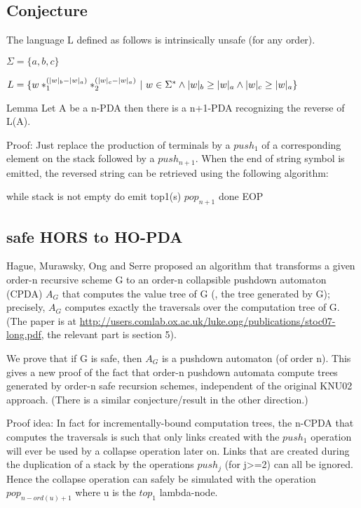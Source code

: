 \documentclass{article}
\begin{document}
\subsection{Conjecture}
The language L defined as follows is intrinsically unsafe (for any order).

$\Sigma = \{ a, b, c \}$

$L = \{ w *_1^{(|w|_b - |w|_a)} *_2^{(|w|_c - |w|_a)} \ | \
   w \in \Sigma^* \wedge |w|_b \geq |w|_a \wedge |w|_c \geq |w|_a \}$




Lemma Let A be a n-PDA then there is a n+1-PDA recognizing
the reverse of L(A).

Proof: Just replace the production of terminals by a $push_1$
of a corresponding element on the stack followed by a $push_{n+1}$.
When the end of string symbol is emitted, the reversed string can be
retrieved using the following algorithm:

    while stack is not empty do
       emit top1(s)
       $pop_{n+1}$
    done
EOP





\subsection{safe HORS to HO-PDA}

Hague, Murawsky, Ong and Serre proposed an algorithm that transforms a
given order-n recursive scheme G to an order-n collapsible pushdown
 automaton (CPDA) $A_G$ that computes the value tree of G (\ie, the tree
 generated by G); precisely, $A_G$ computes exactly the traversals over the
 computation tree of G. (The paper is at
\url{http://users.comlab.ox.ac.uk/luke.ong/publications/stoc07-long.pdf},
the relevant part is section 5).

We prove that if G is safe, then $A_G$ is a pushdown automaton
 (of order n). This gives a new proof of the fact that order-n pushdown automata compute
 trees generated by order-n safe recursion schemes, independent of the
 original KNU02 approach. (There is a similar conjecture/result in the
 other direction.)


Proof idea:
In fact for incrementally-bound computation trees,
the n-CPDA that computes the traversals is  such that only links created with the $push_1$
operation will ever be used by a collapse operation later on.
Links that are created during the duplication of a stack by the
operations $push_j$ (for j>=2) can all be ignored. Hence the
collapse operation can safely be simulated with the operation
$pop_{n-ord(u)+1}$ where u is the $top_1$ lambda-node.
\end{document}
